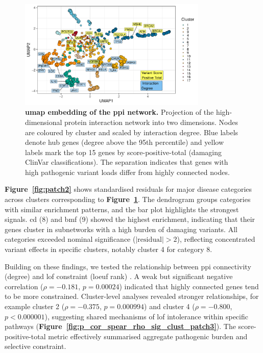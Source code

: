 \begin{figure}[h]
  \centering
  \includegraphics[width=0.8\textwidth]{../images/untangleR_ppi_network_umap.pdf}
  \caption{
    \textbf{\ac{umap} embedding of the \ac{ppi} network.} 
    Projection of the high-dimensional protein interaction network into two dimensions. Nodes are coloured by cluster and scaled by interaction degree. Blue labels denote hub genes (degree above the 95th percentile) and yellow labels mark the top 15 genes by score-positive-total (damaging ClinVar classifications). The separation indicates that genes with high pathogenic variant loads differ from highly connected nodes.
  }
  \label{fig:p_umap}
\end{figure}


\textbf{Figure~\ref{fig:patch2}} shows standardised residuals for major disease categories across clusters corresponding to \textbf{Figure~\ref{fig:p_umap}}. The dendrogram groups categories with similar enrichment patterns, and the bar plot highlights the strongest signals. \ac{cd} (8) and \ac{bmf} (9) showed the highest enrichment, indicating that their genes cluster in subnetworks with a high burden of damaging variants. All categories exceeded nominal significance (\(|\mathrm{residual}| > 2\)), reflecting concentrated variant effects in specific clusters, notably cluster 4 for category 8.


Building on these findings, we tested the relationship between \ac{ppi} connectivity (degree) and \ac{lof} constraint (\ac{loeuf} rank) \cite{karczewski2020mutational}. A weak but significant negative correlation ($\rho=-0.181$, $p=0.00024$) indicated that highly connected genes tend to be more constrained. Cluster-level analyses revealed stronger relationships, for example cluster 2 ($\rho=-0.375$, $p=0.000994$) and cluster 4 ($\rho=-0.800$, $p<0.000001$), suggesting shared mechanisms of \ac{lof} intolerance within specific pathways (\textbf{Figure~\ref{fig:p_cor_spear_rho_sig_clust_patch3}}). The score-positive-total metric effectively summarised aggregate pathogenic burden and selective constraint.


